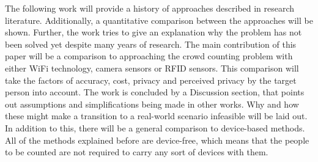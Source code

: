 \documentclass[conference]{IEEEtran}
\begin{document}
\par
The following work will provide a history of approaches described in research literature. Additionally, a quantitative comparison between the approaches will be shown. Further, the work tries to give an explanation why the problem has not been solved yet despite many years of research. The main contribution of this paper will be a comparison to approaching the crowd counting problem with either WiFi technology, camera sensors or RFID sensors. This comparison will take the factors of accuracy, cost, privacy and perceived privacy by the target person into account. The work is concluded by a Discussion section, that points out assumptions and simplifications being made in other works. Why and how these might make a transition to a real-world scenario infeasible will be laid out. In addition to this, there will be a general comparison to device-based methods. All of the methods explained before are device-free, which means that the people to be counted are not required to carry any sort of devices with them.
\end{document}
